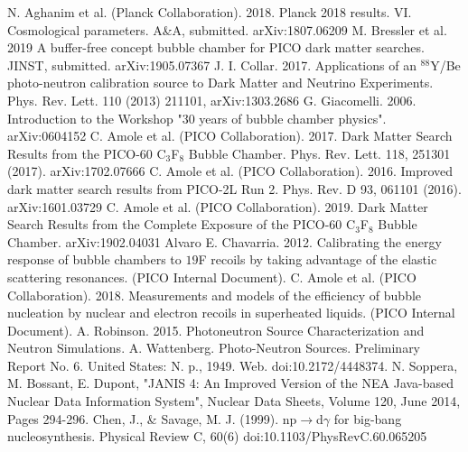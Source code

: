 \documentclass[%
12pt,
twoside,
reprint,
amsmath,amssymb,
aps,
]{article}
\begin{document}
	\pagebreak
	\begin{thebibliography}{1}
		\footnotesize
		 N. Aghanim et al. (Planck Collaboration). 2018. Planck 2018 results. VI. Cosmological parameters. A\&A, submitted. arXiv:1807.06209
		 M. Bressler et al. 2019 A buffer-free concept bubble chamber for PICO dark matter searches. JINST, submitted. arXiv:1905.07367
		 J. I. Collar. 2017. Applications of an $^{88}$Y/Be photo-neutron calibration source
		to Dark Matter and Neutrino Experiments. Phys. Rev. Lett. 110 (2013) 211101, arXiv:1303.2686
		 G. Giacomelli. 2006. Introduction to the Workshop "30 years of bubble chamber physics". arXiv:0604152
		 C. Amole et al. (PICO Collaboration). 2017. Dark Matter Search Results from the PICO-60 C$_{3}$F$_{8}$ Bubble Chamber. Phys. Rev. Lett. 118, 251301 (2017). arXiv:1702.07666 
		 C. Amole et al. (PICO Collaboration). 2016. Improved dark matter search results from PICO-2L Run 2. Phys. Rev. D 93, 061101 (2016). arXiv:1601.03729
		 C. Amole et al. (PICO Collaboration). 2019. Dark Matter Search Results from the  Complete Exposure of the PICO-60 C$_{3}$F$_{8}$ Bubble Chamber. arXiv:1902.04031 
		 Alvaro E. Chavarria. 2012. Calibrating the energy response of bubble chambers to ${19}$F recoils by taking advantage of the elastic scattering resonances. (PICO Internal Document).
		 C. Amole et al. (PICO Collaboration). 2018. Measurements and models of the efficiency of bubble nucleation by nuclear and electron recoils in superheated liquids. (PICO Internal Document).
		 A. Robinson. 2015. Photoneutron Source Characterization and Neutron Simulations.
		 A. Wattenberg. Photo-Neutron Sources. Preliminary Report No. 6. United States: N. p., 1949. Web. doi:10.2172/4448374.
		 N. Soppera, M. Bossant, E. Dupont, "JANIS 4: An Improved Version of the NEA Java-based Nuclear Data Information System", Nuclear Data Sheets, Volume 120, June 2014, Pages 294-296.
		 Chen, J., \& Savage, M. J. (1999). np$\rightarrow$d$\gamma$ for big-bang nucleosynthesis. Physical Review C, 60(6) doi:10.1103/PhysRevC.60.065205
		
	\end{thebibliography}
	\normalsize
\end{document}
